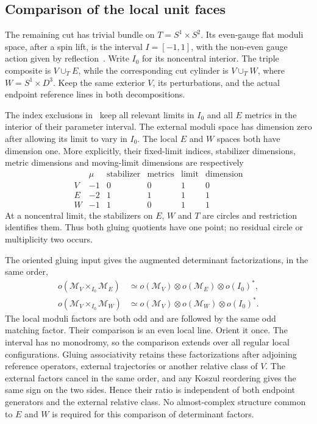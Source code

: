 \documentclass[11pt]{amsart}
\theoremstyle{definition}
\theoremstyle{remark}
\theoremstyle{plain}
\begin{document}
\subsection{Comparison of the local unit faces}
The remaining cut has trivial bundle on $T=S^1\times S^2$.
Its even-gauge flat moduli space, after a spin lift, is the
interval $I=[-1,1]$, with the non-even gauge action given by
reflection~\cite[Lemma~5.3 and the preceding discussion]{Scaduto}.
Write $I_0$ for its noncentral interior.
The triple composite is $V\cup_T E$, while the corresponding
cut cylinder is $V\cup_T W$, where $W=S^1\times D^3$.
Keep the same exterior $V$, its perturbations, and the actual
endpoint reference lines in both decompositions.

The index exclusions in~\cite[Lemma~5.4 and proof of Lemma~5.2]{Scaduto}
keep all relevant limits in $I_0$ and all $E$ metrics in the
interior of their parameter interval. The external moduli space
has dimension zero after allowing its limit to vary in $I_0$.
The local $E$ and $W$ spaces both have dimension one. More
explicitly, their fixed-limit indices, stabilizer dimensions,
metric dimensions and moving-limit dimensions are respectively
\[
 \begin{array}{c|rrrr|r}
  &\mu&\text{stabilizer}&\text{metrics}&\text{limit}&\text{dimension}\\\hline
 V&-1&0&0&1&0\\
 E&-2&1&1&1&1\\
 W&-1&1&0&1&1
 \end{array}
\]
At a noncentral limit, the stabilizers on $E$, $W$ and $T$
are circles and restriction identifies them. Thus both gluing
quotients have one point; no residual circle or multiplicity
two occurs.

The oriented gluing input gives the augmented determinant
factorizations, in the same order,
\begin{align}\label{eq:local-unit-lines}
 o(\mathcal M_V\times_{I_0}\mathcal M_E)
  &\simeq o(\mathcal M_V)\otimes o(\mathcal M_E)\otimes o(I_0)^*,\nonumber\\
 o(\mathcal M_V\times_{I_0}\mathcal M_W)
  &\simeq o(\mathcal M_V)\otimes o(\mathcal M_W)\otimes o(I_0)^*.
\end{align}
The local moduli factors are both odd and are followed by the
same odd matching factor. Their comparison is an even local line.
Orient it once. The interval has no monodromy, so the comparison
extends over all regular local configurations. Gluing associativity
retains these factorizations after adjoining reference operators,
external trajectories or another relative class of $V$. The
external factors cancel in the same order, and any Koszul
reordering gives the same sign on the two sides. Hence their
ratio is independent of both endpoint generators and the external
relative class. No almost-complex structure common to $E$ and
$W$ is required for this comparison of determinant factors.
\end{document}

